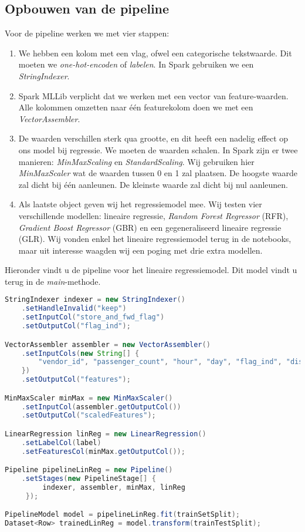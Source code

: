 \documentclass[a4paper,10pt,twoside]{report}
\begin{document}
\newpage


\subsection*{Opbouwen van de pipeline}

Voor de pipeline werken we met vier stappen:

\begin{enumerate}
	\item We hebben een kolom met een vlag, ofwel een categorische tekstwaarde. Dit moeten we \textit{one-hot-encoden} of \textit{labelen}. In Spark gebruiken we een \textit{StringIndexer}.
	
	\item Spark MLLib verplicht dat we werken met een vector van feature-waarden. Alle kolommen omzetten naar één featurekolom doen we met een \textit{VectorAssembler}. 
	
	\item De waarden verschillen sterk qua grootte, en dit heeft een nadelig effect op ons model bij regressie. We moeten de waarden schalen. In Spark zijn er twee manieren: \textit{MinMaxScaling} en \textit{StandardScaling}. Wij gebruiken hier \textit{MinMaxScaler} wat de waarden tussen 0 en 1 zal plaatsen. De hoogste waarde zal dicht bij één aanleunen. De kleinste waarde zal dicht bij nul aanleunen.
	
	\item Als laatste object geven wij het regressiemodel mee. Wij testen vier verschillende modellen: lineaire regressie, \textit{Random Forest Regressor} (RFR), \textit{Gradient Boost Regressor} (GBR) en een gegeneraliseerd lineaire regressie (GLR). Wij vonden enkel het lineaire regressiemodel terug in de notebooks, maar uit interesse waagden wij een poging met drie extra modellen. 
	
\end{enumerate}

Hieronder vindt u de pipeline voor het lineaire regressiemodel. Dit model vindt u terug in de \textit{main}-methode.

\begin{lstlisting}[language=Java]
StringIndexer indexer = new StringIndexer()
	.setHandleInvalid("keep")
	.setInputCol("store_and_fwd_flag")
	.setOutputCol("flag_ind");

VectorAssembler assembler = new VectorAssembler()
	.setInputCols(new String[] { 
		"vendor_id", "passenger_count", "hour", "day", "flag_ind", "distance" 
	})
	.setOutputCol("features");

MinMaxScaler minMax = new MinMaxScaler()
	.setInputCol(assembler.getOutputCol())
	.setOutputCol("scaledFeatures");

LinearRegression linReg = new LinearRegression()
	.setLabelCol(label)
	.setFeaturesCol(minMax.getOutputCol());

Pipeline pipelineLinReg = new Pipeline()
	.setStages(new PipelineStage[] {
		 indexer, assembler, minMax, linReg 
	 });

PipelineModel model = pipelineLinReg.fit(trainSetSplit);
Dataset<Row> trainedLinReg = model.transform(trainTestSplit);
\end{lstlisting}
\end{document}
